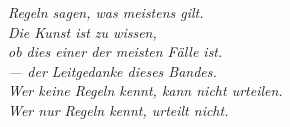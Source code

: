 \bigskip
\begin{flushright}
\itshape\color{grau}
Regeln sagen, was meistens gilt.\\
Die Kunst ist zu wissen,\\
ob dies einer der meisten Fälle ist.\\[10pt]
\normalfont\color{grau}\upshape
--- der Leitgedanke dieses Bandes.\\
\itshape Wer keine Regeln kennt, kann nicht urteilen.\\
Wer nur Regeln kennt, urteilt nicht.
\end{flushright}
